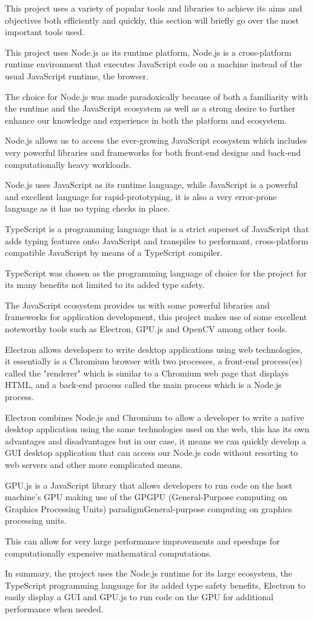\documentclass[12pt]{article}
\newcommand{\sentence}{} %
\begin{document}
    \tab
    This project uses a variety of popular tools and libraries to achieve its aims and objectives both efficiently
    and quickly, this section will briefly go over the most important tools used.
    \sentence
    This project uses Node.js as its runtime platform, Node.js is a cross-platform runtime environment that executes
    JavaScript code on a machine instead of the usual JavaScript runtime, the browser.
    \sentence
    The choice for Node.js was made paradoxically because of both a familiarity with the runtime and the JavaScript
    ecosystem as well as a strong desire to further enhance our knowledge and experience in both the platform and
    ecosystem.
    \sentence
    Node.js allows us to access the ever-growing JavaScript ecosystem which includes very powerful libraries and
    frameworks for both front-end designs and back-end computationally heavy workloads.
    \sentence
    Node.js uses JavaScript as its runtime language, while JavaScript is a powerful and excellent language for
    rapid-prototyping, it is also a very error-prone language as it has no typing checks in place.
    \sentence
    TypeScript is a programming language that is a strict superset of JavaScript that adds typing features onto
    JavaScript and transpiles to performant, cross-platform compatible JavaScript by means of a TypeScript compiler.
    \sentence
    TypeScript was chosen as the programming language of choice for the project for its many benefits not limited to
    its added type safety.
    \sentence
    The JavaScript ecosystem provides us with some powerful libraries and frameworks for application development,
    this project makes use of some excellent noteworthy tools such as Electron, GPU.js and OpenCV among other tools.
    \sentence
    Electron allows developers to write desktop applications using web technologies, it essentially is a Chromium
    browser with two processes, a front-end process(es) called the "renderer" which is similar to a Chromium web page
    that displays HTML, and a back-end process called the main process which is a Node.js process.
    \sentence
    Electron combines Node.js and Chromium to allow a developer to write a native desktop application using the same
    technologies used on the web, this has its own advantages and disadvantages but in our case, it means we can
    quickly develop a GUI desktop application that can access our Node.js code without resorting to web servers and
    other more complicated means.
    \sentence
    GPU.js is a JavaScript library that allows developers to run code on the host machine's GPU making use of the
    GPGPU (General-Purpose computing on Graphics Processing Units) paradigmGeneral-purpose computing on graphics
    processing units.
    \sentence
    This can allow for very large performance improvements and speedups for computationally expensive mathematical
    computations.
    \sentence
    \sentence
    In summary, the project uses the Node.js runtime for its large ecosystem, the TypeScript programming language for
    its added type safety benefits, Electron to easily display a GUI and GPU.js to run code on the GPU for additional
    performance when needed.
    \pagebreak
\end{document}
